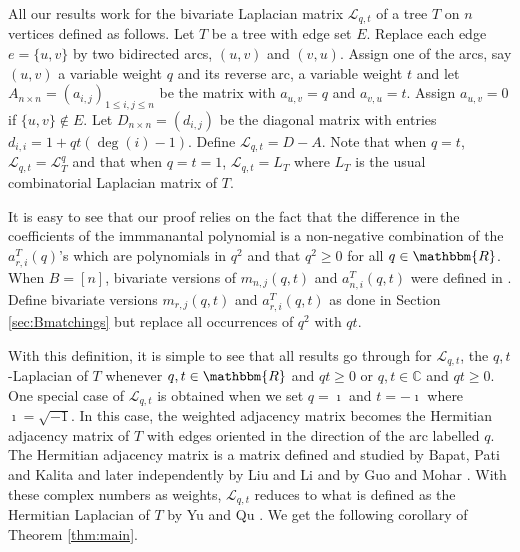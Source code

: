 \documentclass[12pt]{article}
\newtheorem{remark}[theorem]{Remark}
\newcommand{\sL}{  \mathcal{ L}}
\newcommand{\RR}{ \mathbbm{R}}
\newcommand{\rhalf}{\lfloor r/2 \rfloor}
\newcommand{\comment}[1]{}
\newcommand{\red}[1]{\textcolor{red}{#1}}
\newcommand{\CC}{ \mathbb{C}}
\begin{document}
All our results work for the bivariate Laplacian matrix $\sL_{q,t}$ 
of a tree $T$ on $n$ vertices defined as follows.  Let $T$ be a tree with edge
set $E$.  Replace each edge $e = \{u,v\}$ by two bidirected arcs, 
$(u,v)$ and $(v,u)$.  Assign one of the arcs, say $(u,v)$ a variable 
weight $q$ and its reverse arc, a variable weight $t$ and let 
$A_{n \times n} = (a_{i,j})_{1 \leq i,j \leq n}$ be the matrix
with $a_{u,v} = q$ and $a_{v,u} = t$.  Assign $a_{u,v} = 0$ if 
$\{u,v\} \not \in E$.
Let $D_{n \times n} = (d_{i,j})$ be 
the diagonal matrix with entries $d_{i,i} = 1+qt(\deg(i)-1)$.
Define $\sL_{q,t} = D - A$.  Note that when $q=t$, $\sL_{q,t} = \sL_T^q$
and that when $q=t=1$, $\sL_{q,t} = L_T$ where $L_T$ is the usual
combinatorial Laplacian matrix of $T$.



It is easy to see that our proof relies on the fact that the difference
in the coefficients of the immmanantal polynomial is a non-negative 
combination of the $a_{r,i}^T(q)$'s which are polynomials in $q^2$ and
that $q^2 \geq 0$ for all $q \in \RR$.  When $B = [n]$, bivariate
versions of $m_{n,j}(q,t)$ and $a_{n,i}^T(q,t)$ were defined in 
\cite{mukesh-siva-hook}.  Define bivariate versions $m_{r,j}(q,t)$ 
and $a_{r,i}^T(q,t)$ as done in Section \ref{sec:Bmatchings}
but replace all occurrences of $q^2$ with $qt$.

\comment{
\red{
\begin{remark}
Let $T$ be a tree on $n$ vertices with $q,t$-Laplacian  $\sL_{q,t}$. Then, 
 for $0\leq r \leq n$,
the coefficient of $(-1)^rx^{n-r}$ in the immanantal polynomial of $\sL_{q,t}$ 
indexed by $\lambda\vdash n$ equals $\sum_{i=0}^{\rhalf}2^ia_{r,i}^T(q,t) 
\alpha_{\lambda,i}^{}$.
\end{remark}
}}

With this definition, it is simple to see that all results go through for $\sL_{q,t}$, the 
$q,t$-Laplacian of $T$ whenever $q,t \in \RR$ and $qt \geq 0$ or
$q,t \in \CC$ and $qt \geq 0$.   One special case of $\sL_{q,t}$ is 
obtained when we set $q=\imath$ and $t=-\imath$ where 
$\imath = \sqrt{-1}$. In this
case, the weighted adjacency matrix becomes the Hermitian adjacency 
matrix of $T$ with edges oriented in the direction of the 
arc labelled $q$.  The Hermitian adjacency matrix is a matrix
defined and studied by Bapat, Pati and Kalita 
\cite{bapat-pati-kalita_weighted_digraphs} and later independently
by Liu and Li \cite{liu-li-hermitian-adj}
and by Guo and Mohar \cite{guo-mohar-hermitian-adj}.	
With these complex numbers as weights, $\sL_{q,t}$ reduces to what is defined as the 
Hermitian Laplacian of $T$ by Yu and Qu \cite{yu-qu-hermitian-Laplacian}.
We get the following corollary of Theorem \ref{thm:main}.
\end{document}

